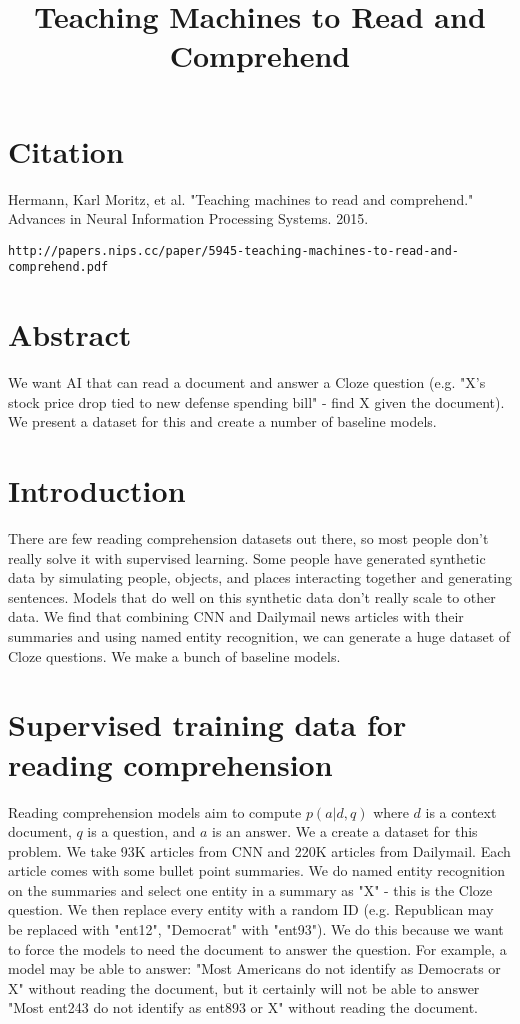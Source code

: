 \documentclass[a4paper]{article}
\title{Teaching Machines to Read and Comprehend}
\date{}
\begin{document}
\maketitle

\section{Citation}
Hermann, Karl Moritz, et al. "Teaching machines to read and comprehend." Advances in Neural Information Processing Systems. 2015.

\begin{verbatim}
http://papers.nips.cc/paper/5945-teaching-machines-to-read-and-comprehend.pdf
\end{verbatim}

\section{Abstract}
We want AI that can read a document and answer a Cloze question (e.g.
"X's stock price drop tied to new defense spending bill" - find X given
the document). We present a dataset for this and create a number of baseline
models.

\section{Introduction}
There are few reading comprehension datasets out there, so most people don't
really solve it with supervised learning. Some people have generated synthetic
data by simulating people, objects, and places interacting together and
generating sentences. Models that do well on this synthetic data don't really
scale to other data. We find that combining CNN and Dailymail news articles with
their summaries and using named entity recognition, we can generate
a huge dataset of Cloze questions. We make a bunch of baseline models.

\section{Supervised training data for reading comprehension}
Reading comprehension models aim to compute $p(a|d, q)$ where $d$ is a
context document, $q$ is a question, and $a$ is an answer. We a create a
dataset for this problem. We take 93K articles from CNN and 220K articles
from Dailymail. Each article comes with some bullet point summaries. We
do named entity recognition on the summaries and select one entity in a summary
as "X" - this is the Cloze question. We then replace every entity with a
random ID (e.g. Republican may be replaced with "ent12", "Democrat" with
"ent93"). We do this because we want to force the models to need the
document to answer the question. For example, a model may be able to answer:
"Most Americans do not identify as Democrats or X" without reading the
document, but it certainly will not be able to answer "Most ent243 do not
identify as ent893 or X" without reading the document.
\end{document}
